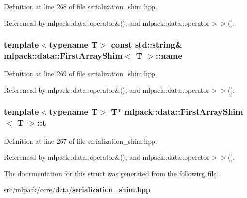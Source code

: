 Definition at line 268 of file serialization\+\_\+shim.\+hpp.



Referenced by mlpack\+::data\+::operator\&(), and mlpack\+::data\+::operator$>$$>$().

\subsubsection[{name}]{\setlength{\rightskip}{0pt plus 5cm}template$<$typename T$>$ const {\bf std\+::string}\& {\bf mlpack\+::data\+::\+First\+Array\+Shim}$<$ T $>$\+::name}\label{structmlpack_1_1data_1_1FirstArrayShim_a727f7dfc23ba3990365250a844d5d7e5}


Definition at line 269 of file serialization\+\_\+shim.\+hpp.



Referenced by mlpack\+::data\+::operator\&(), and mlpack\+::data\+::operator$>$$>$().

\subsubsection[{t}]{\setlength{\rightskip}{0pt plus 5cm}template$<$typename T$>$ T$\ast$ {\bf mlpack\+::data\+::\+First\+Array\+Shim}$<$ T $>$\+::t}\label{structmlpack_1_1data_1_1FirstArrayShim_a25e9d34be6b4bb73c79071c1d8c8b589}


Definition at line 267 of file serialization\+\_\+shim.\+hpp.



Referenced by mlpack\+::data\+::operator\&(), and mlpack\+::data\+::operator$>$$>$().



The documentation for this struct was generated from the following file\+:\begin{DoxyCompactItemize}
\item 
src/mlpack/core/data/{\bf serialization\+\_\+shim.\+hpp}\end{DoxyCompactItemize}

